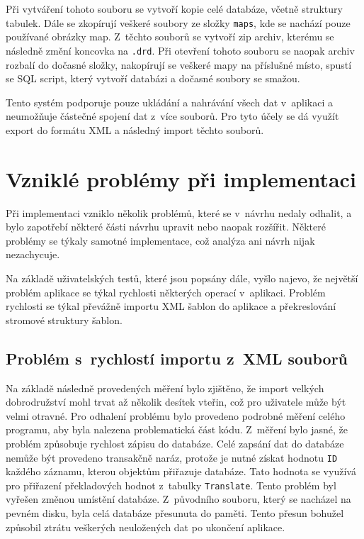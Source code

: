\documentclass[thesis=B,czech]{resources/FITthesis}[2012/06/26]
\begin{document}
Při vytváření tohoto souboru se vytvoří kopie celé databáze, včetně struktury tabulek. Dále se zkopírují veškeré soubory ze složky \texttt{maps}, kde se nachází pouze používané obrázky map. Z~těchto souborů se vytvoří zip archiv, kterému se následně změní koncovka na \texttt{.drd}. Při otevření tohoto souboru se naopak archiv rozbalí do dočasné složky, nakopírují se veškeré mapy na příslušné místo, spustí se SQL script, který vytvoří databázi a dočasné soubory se smažou. \par

Tento systém podporuje pouze ukládání a nahrávání všech dat v~aplikaci a neumožňuje částečné spojení dat z~více souborů. Pro tyto účely se dá využít export do formátu XML a následný import těchto souborů. 


\section{Vzniklé problémy při implementaci}
\label{problemy_implementace}
Při implementaci vzniklo několik problémů, které se v~návrhu nedaly odhalit, a bylo zapotřebí některé části návrhu upravit nebo naopak rozšířit. Některé problémy se týkaly samotné implementace, což analýza ani návrh nijak nezachycuje. \par 

Na základě uživatelských testů, které jsou popsány dále, vyšlo najevo, že největší problém aplikace se týkal rychlosti některých operací v~aplikaci. Problém rychlosti se týkal převážně importu XML šablon do aplikace a překreslování stromové struktury šablon.

	\subsection{Problém s~rychlostí importu z~XML souborů}
Na základě následně provedených měření bylo zjištěno, že import velkých dobrodružství mohl trvat až několik desítek vteřin, což pro uživatele může být velmi otravné. Pro odhalení problému bylo provedeno podrobné měření celého programu, aby byla nalezena problematická část kódu. Z~měření bylo jasné, že problém způsobuje rychlost zápisu do databáze. Celé zapsání dat do databáze nemůže být provedeno transakčně naráz, protože je nutné získat hodnotu \texttt{ID} každého záznamu, kterou objektům přiřazuje databáze. Tato hodnota se využívá pro přiřazení překladových hodnot z~tabulky \texttt{Translate}. Tento problém byl vyřešen změnou umístění databáze. Z~původního souboru, který se nacházel na pevném disku, byla celá databáze přesunuta do paměti. Tento přesun bohužel způsobil ztrátu veškerých neuložených dat po ukončení aplikace. \par 
\end{document}
